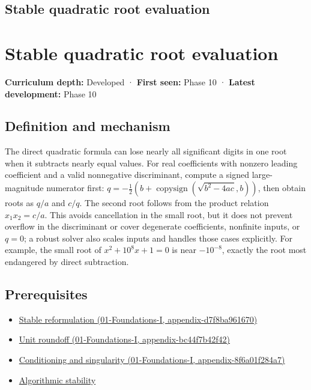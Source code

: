 \hypertarget{appendix-b9afba7f63e5}{}
\section*{Stable quadratic root evaluation}
\chapter{Stable quadratic root evaluation}\label{appendix-b9afba7f63e5-stable-quadratic-root-evaluation}

\textbf{Curriculum depth:} Developed · \textbf{First seen:} Phase 10 · \textbf{Latest development:} Phase 10

\section{Definition and mechanism}\label{appendix-b9afba7f63e5-definition-and-mechanism}

The direct quadratic formula can lose nearly all significant digits in one root when it subtracts nearly equal values. For real coefficients with nonzero leading coefficient and a valid nonnegative discriminant, compute a signed large-magnitude numerator first: \(q=-\frac12(b+\operatorname{copysign}(\sqrt{b^2-4ac},b))\), then obtain roots as \(q/a\) and \(c/q\). The second root follows from the product relation \(x_1x_2=c/a\). This avoids cancellation in the small root, but it does not prevent overflow in the discriminant or cover degenerate coefficients, nonfinite inputs, or \(q=0\); a robust solver also scales inputs and handles those cases explicitly. For example, the small root of \(x^2+10^8x+1=0\) is near \(-10^{-8}\), exactly the root most endangered by direct subtraction.

\section{Prerequisites}\label{appendix-b9afba7f63e5-prerequisites}

\begin{itemize}
\tightlist
\item
  \href{../01-Foundations-I/main.pdf\#nameddest=appendix-d7f8ba961670}{Stable reformulation (01-Foundations-I, appendix-d7f8ba961670)}
\item
  \href{../01-Foundations-I/main.pdf\#nameddest=appendix-bc44f7b42f42}{Unit roundoff (01-Foundations-I, appendix-bc44f7b42f42)}
\item
  \href{../01-Foundations-I/main.pdf\#nameddest=appendix-8f6a01f284a7}{Conditioning and singularity (01-Foundations-I, appendix-8f6a01f284a7)}
\item
  \hyperref[appendix-aa2bf0d79639]{Algorithmic stability}
\end{itemize}

